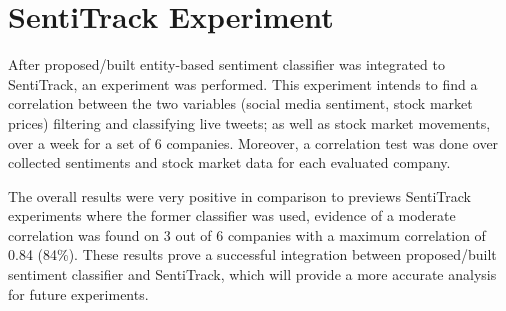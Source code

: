 \section{SentiTrack Experiment}

After proposed/built entity-based sentiment classifier was integrated to SentiTrack, an experiment was performed. This experiment intends to find a correlation between the two variables (social media sentiment, stock market prices) filtering and classifying live tweets; as well as stock market movements, over a week for a set of 6 companies. Moreover, a correlation test was done over collected sentiments and stock market data for each evaluated company. 

The overall results were very positive in comparison to previews SentiTrack experiments where the former classifier was used, evidence of a moderate correlation was found on 3 out of 6 companies with a maximum correlation of 0.84 (84\%). These results prove a successful integration between proposed/built sentiment classifier and SentiTrack, which will provide a more accurate analysis for future experiments. 


